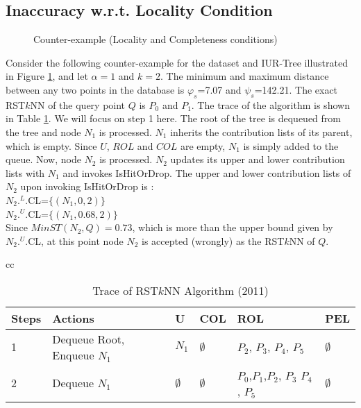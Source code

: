 \documentclass[prodmode,letterpaper]{acmsmall}
\newcommand{\rstknn}{RST$k$NN\xspace}
\begin{document}
\subsection{Inaccuracy w.r.t. Locality Condition}\label{subsec:locality}
\begin{figure}[!htb]
\begin{center}
\caption{\small Counter-example (Locality and Completeness conditions)
\label{fig:counter-ex}
 } 
\end{center}
\end{figure}

Consider the following counter-example for the dataset and IUR-Tree illustrated in Figure
\ref{fig:counter-ex}, and let $\alpha=1$ and $k=2$. The minimum and maximum distance between any two points in the database is $\varphi_s$=7.07 and $\psi_s$=142.21. The exact \rstknn of the
query point $Q$ is $P_0$ and $P_1$. The trace of the algorithm \cite{lu2011reverse} is shown in Table
\ref{Tab:rstknn_algo}. We will focus on step 1 here. The root of the tree is dequeued from the tree and node $N_1$ is processed. $N_1$ inherits the contribution lists of its parent, which is empty. Since $U$, $ROL$ and $COL$ are empty, $N_1$ is simply added to the queue. Now, node $N_2$ is processed. $N_2$ updates
its upper and lower contribution lists with $N_1$ and invokes IsHitOrDrop. The upper and lower contribution lists of $N_2$ upon invoking IsHitOrDrop is :\\
$N_2.^{L}$.CL=$\lbrace (N_1,0,2) \rbrace$\\
$N_2.^{U}$.CL=$\lbrace (N_1,0.68,2) \rbrace$\\
Since $MinST(N_2,Q)=0.73$, which is more than the upper bound given by
$N_2.^{U}$.CL, at this point node $N_2$ is accepted (wrongly) as the \rstknn of $Q$. \begin{table}[!htb]
\begin{tabular}{cc}\noindent\begin{minipage}[t]{\linewidth}
\begin{center}
\caption{Trace of \rstknn Algorithm (2011) \label{Tab:rstknn_algo}}
    \begin{tabular}{|l | p{4cm} | l | l | l | l |}
    \hline
    \bfseries{Steps} & \bfseries{Actions} & \bfseries{U}& \textbf{COL} & \textbf{ROL} & \textbf{PEL} \\
    \hline
    1 & Dequeue Root, Enqueue $N_1$ & $N_1$ &$\emptyset$& $P_2$, $P_3$, $P_4$, $P_5$ & $\emptyset$\\ 
    \hline
    2 & Dequeue $N_1$ & $\emptyset$ & $\emptyset$ & $P_0$,$P_1$,$P_2$, $P_3$ $P_4$, $P_5$ & $\emptyset$\\
    \hline
    \end{tabular}
\end{center}
\end{minipage}
 \end{tabular}
\end{table} 
\end{document}
